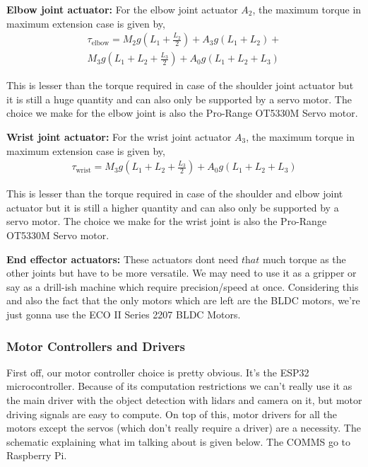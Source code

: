 \documentclass[12pt]{article}
\providecommand{\brak}[1]{\ensuremath{\left(#1\right)}}
\begin{document}
\textbf{Elbow joint actuator:} 
For the elbow joint actuator $A_2$, the maximum torque in maximum extension case is given by,
\begin{multline*}
    \tau_{\text{elbow}} = M_2 g \brak{L_1 + \frac{L_2}{2}} + A_3 g \brak{L_1 + L_2} + \\ M_3 g \brak{L_1 + L_2 + \frac{L_3}{2}} + A_0 g \brak{L_1 + L_2 + L_3}
\end{multline*}

This is lesser than the torque required in case of the shoulder joint actuator but it is still a huge quantity and can also only be supported by a servo motor. The choice we make for the elbow joint is also the Pro-Range OT5330M Servo motor.

\textbf{Wrist joint actuator:} 
For the wrist joint actuator $A_3$, the maximum torque in maximum extension case is given by,
\begin{align*}
    \tau_{\text{wrist}} = M_3 g \brak{L_1 + L_2 + \frac{L_3}{2}} + A_0 g \brak{L_1 + L_2 + L_3}
\end{align*}

This is lesser than the torque required in case of the shoulder and elbow joint actuator but it is still a higher quantity and can also only be supported by a servo motor. The choice we make for the wrist joint is also the Pro-Range OT5330M Servo motor.

\textbf{End effector actuators:} These actuators dont need $\textit{that}$ much torque as the other joints but have to be more versatile. We may need to use it as a gripper or say as a drill-ish machine which require precision/speed at once. Considering this and also the fact that the only motors which are left are the BLDC motors, we're just gonna use the ECO II Series 2207 BLDC Motors.

\subsubsection*{Motor Controllers and Drivers}
First off, our motor controller choice is pretty obvious. It's the ESP32 microcontroller. Because of its computation restrictions we can't really use it as the main driver with the object detection with lidars and camera on it, but motor driving signals are easy to compute.
\newline
On top of this, motor drivers for all the motors except the servos (which don't really require a driver) are a necessity. The schematic explaining what im talking about is given below. The COMMS go to Raspberry Pi.
\end{document}
